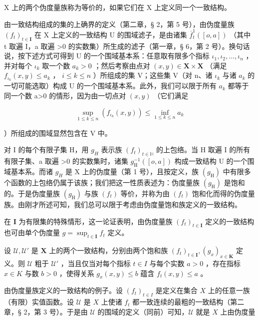 X 上的两个伪度量族称为等价的，如果它们在 X 上定义同一个一致结构。

由一致结构组成的集的上确界的定义（第二章，§ 2，第 5 号），由伪度量族 \((f_{t})_{t\in\mathbf{I}}\) 在 X 上定义的一致结构 U 的围域滤子，是由诸集 \(\overline{f}_{t}^{1}([o,a])\) （其中 t 取遍 I，a 取遍 \textgreater0 的实数集）所生成的滤子（第一章，§ 6，第 2 号）。换句话说，按下述方式可得到 U 的一个围域基本系：任意取有限多个指标 \(\iota_{1},\iota_{2},\ldots,\iota_{n}\) ，并对每个 \(\iota_{k}\) 取一个数 \(a_{k}>0\) ；然后考察由点对 \((x,y)\in\mathbf{X}\times\mathbf{X}\) （满足 \(f_{\iota_{k}}(x,y)\leqslant a_{k}\) ， \(i\leqslant k\leqslant n\) ）所组成的集 V；这些集 V（对 n、诸 \(\iota_{k}\) 与诸 \(a_{k}\) 的一切可能选取）构成 U 的一个围域基本系。此外，我们可以限于所有 \(a_{k}\) 都等于同一个数 a\textgreater0 的情形，因为由一切点对 \((x,y)\) （它们满足

\[
\sup _ {1 \leqslant k \leqslant n} \left(f _ {\iota_ {k}} (x, y)\right) \leqslant \inf _ {1 \leqslant k \leqslant n} a _ {k}
\]

）所组成的围域显然包含在 V 中。

对 I 的每个有限子集 H，用 \(g_{H}\) 表示族 \((f_{t})_{t\in\mathbb{H}}\) 的上包络。当 H 取遍 I 的所有有限子集、a 取遍 \textgreater0 的实数集时，诸集 \(g_{\mathrm{H}}^{-1}([o,a])\) 构成一致结构 U 的一个围域基本系。而诸 \(g_{H}\) 是 X 上的伪度量（第 1 号），且按定义，族 \((g_{\mathrm{H}})\) 中有限多个函数的上包络仍属于该族；我们把这一性质表述为：伪度量族 \((g_{\mathrm{H}})\) 是饱和的。于是伪度量族 \((g_{\mathrm{H}})\) 与族 \((f_{t})\) 等价，并称为由 \((f_{t})\) 饱和化而得的伪度量族。由刚才所述可知，我们总可以限于考虑由伪度量饱和族定义的一致结构。

在 \(\mathbf{I}\) 为有限集的特殊情形，这一论证表明，由伪度量族 \((f_{t})_{t\in \mathbf{I}}\) 定义的一致结构也可由单个伪度量 \(g = \sup_{t\in \mathbf{I}}f_t\) 定义。

设 \(\mathcal{U},\mathcal{U}'\) 是 \(\mathbf{X}\) 上的两个一致结构，分别由两个饱和族 \((f_{t})_{t\in \mathbf{I}},(g_{x})_{x\in \mathbf{K}}\) 定义。则 \(\mathcal{U}\) 粗于 \(\mathcal{U}'\) ，当且仅当对每个指标 \(t\in I\) 与每个实数 \(a > 0\) ，存在指标 \(x\in K\) 与数 \(b > 0\) ，使得关系 \(g_{x}(x,y)\leqslant b\) 蕴含 \(f_{t}(x,y)\leqslant a\) 。

由伪度量族定义的一致结构的例子。设 \((f_{t})_{t\in I}\) 是定义在集合 \(X\) 上的任意一族（有限）实值函数。设 \(\mathcal{U}\) 是 \(X\) 上使诸 \(f_{t}\) 都一致连续的最粗的一致结构（第二章，§ 2，第 3 号）。于是由 \(\mathcal{U}\) 的围域的定义（同前）可知，\(\mathcal{U}\) 就是 \(X\) 上由伪度量

